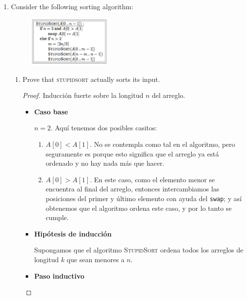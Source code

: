 \documentclass[letterpaper,11pt]{article}
\begin{document}
\begin{enumerate}
    \item Consider the following sorting algorithm:
    \begin{figure}[ht]
        \centering
        \includegraphics[width=0.4\textwidth]{./imagenes/stupidSort.png}
    \end{figure}

    \begin{enumerate}
        \item Prove that \textsc{stupidsort} actually sorts its input.
        \begin{proof}
            Inducción fuerte sobre la longitud $n$ del arreglo. 
            \begin{itemize}
                \item \textbf{Caso base}

                $n = 2$. Aquí tenemos dos posibles casitos:
                \begin{enumerate}
                    \item $A[0] < A[1]$. No se contempla como tal en el
                    algoritmo, pero seguramente es porque esto significa que 
                    el arreglo ya está ordenado y no hay nada más que hacer.

                    \item $A[0] > A[1]$. En este  caso, como el elemento menor 
                    se encuentra al final del arreglo, entonces intercambiamos 
                    las posiciones del primer y último elemento con ayuda del 
                    \texttt{swap}; y así obtenemos que el algoritmo ordena 
                    este caso, y por lo tanto se cumple. 
                \end{enumerate}

                \item \textbf{Hipótesis de inducción}

                Supongamos que el algoritmo \textsc{StupidSort} ordena todos 
                los arreglos de longitud $k$ que sean menores a $n$. 

                \item \textbf{Paso inductivo}


\end{itemize}
\end{proof}
\end{enumerate}
\end{enumerate}
\end{document}
